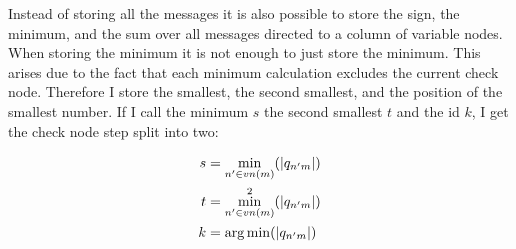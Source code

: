 Instead of storing all the messages it is also possible to store the sign, the minimum, and the sum over all messages directed to a column of variable nodes. When storing the minimum it is not enough to just store the minimum. This arises due to the fact that each minimum calculation excludes the current check node. Therefore I store the smallest, the second smallest, and the position of the smallest number. If I call the minimum $s$ the second smallest $t$ and the id $k$, I get the check node step split into two:

\begin{align}
    s & = \min_{n' \in vn(m)}(\left|q_{n'm}\right|) \\
    t & = \min_{n' \in vn(m)}^2(\left|q_{n'm}\right|) \\
    k & = \operatorname*{arg\,min} (\left|q_{n'm}\right|)
\end{align}